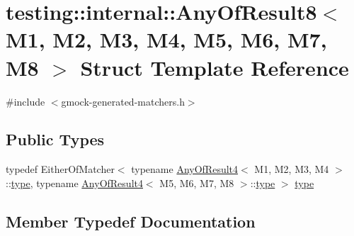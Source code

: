 \hypertarget{structtesting_1_1internal_1_1AnyOfResult8}{}\section{testing\+::internal\+::Any\+Of\+Result8$<$ M1, M2, M3, M4, M5, M6, M7, M8 $>$ Struct Template Reference}
\label{structtesting_1_1internal_1_1AnyOfResult8}


{\ttfamily \#include $<$gmock-\/generated-\/matchers.\+h$>$}

\subsection*{Public Types}
\begin{DoxyCompactItemize}
\item 
typedef Either\+Of\+Matcher$<$ typename \mbox{\hyperlink{structtesting_1_1internal_1_1AnyOfResult4}{Any\+Of\+Result4}}$<$ M1, M2, M3, M4 $>$\+::\mbox{\hyperlink{structtesting_1_1internal_1_1AnyOfResult8_a8f8a1e78a019965c24bd22c78885747d}{type}}, typename \mbox{\hyperlink{structtesting_1_1internal_1_1AnyOfResult4}{Any\+Of\+Result4}}$<$ M5, M6, M7, M8 $>$\+::\mbox{\hyperlink{structtesting_1_1internal_1_1AnyOfResult8_a8f8a1e78a019965c24bd22c78885747d}{type}} $>$ \mbox{\hyperlink{structtesting_1_1internal_1_1AnyOfResult8_a8f8a1e78a019965c24bd22c78885747d}{type}}
\end{DoxyCompactItemize}


\subsection{Member Typedef Documentation}
\mbox{\label{structtesting_1_1internal_1_1AnyOfResult8_a8f8a1e78a019965c24bd22c78885747d}} 
